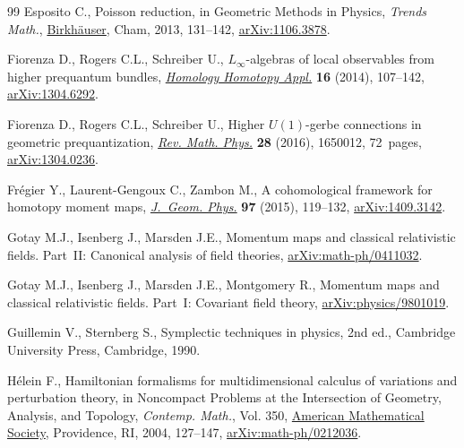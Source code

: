 \documentclass[pdftex]{sigma}
\numberwithin{equation}{section}
\begin{document}
\begin{thebibliography}{99}
Esposito C., Poisson reduction, in Geometric Methods in Physics, \textit{Trends Math.},
  \href{https://doi.org/10.1007/978-3-319-06248-8_11}{Birkh\"auser}, Cham, 2013, 131--142, \href{https://arxiv.org/abs/1106.3878}{arXiv:1106.3878}.

Fiorenza D., Rogers C.L., Schreiber U., {$L_\infty$}-algebras of local
  observables from higher prequantum bundles, \href{https://doi.org/10.4310/HHA.2014.v16.n2.a6}{\textit{Homology Homotopy Appl.}}
  \textbf{16} (2014), 107--142, \href{https://arxiv.org/abs/1304.6292}{arXiv:1304.6292}.

Fiorenza D., Rogers C.L., Schreiber U., Higher {$U(1)$}-gerbe connections in
  geometric prequantization, \href{https://doi.org/10.1142/S0129055X16500124}{\textit{Rev. Math. Phys.}} \textbf{28} (2016),
  1650012, 72~pages, \href{https://arxiv.org/abs/1304.0236}{arXiv:1304.0236}.

Fr\'egier Y., Laurent-Gengoux C., Zambon M., A cohomological framework for
  homotopy moment maps, \href{https://doi.org/10.1016/j.geomphys.2015.07.010}{\textit{J.~Geom. Phys.}} \textbf{97} (2015), 119--132,
  \href{https://arxiv.org/abs/1409.3142}{arXiv:1409.3142}.

Gotay M.J., Isenberg J., Marsden J.E., Momentum maps and classical relativistic
  fields. Part~{II}: {C}anonical analysis of field theories,
  \href{https://arxiv.org/abs/math-ph/0411032}{arXiv:math-ph/0411032}.

Gotay M.J., Isenberg J., Marsden J.E., Montgomery R., Momentum maps and
  classical relativistic fields. {P}art~{I}: {C}ovariant field theory,
  \href{https://arxiv.org/abs/physics/9801019}{arXiv:physics/9801019}.

Guillemin V., Sternberg S., Symplectic techniques in physics, 2nd ed.,
  Cambridge University Press, Cambridge, 1990.

H\'elein F., Hamiltonian formalisms for multidimensional calculus of variations
  and perturbation theory, in Noncompact Problems at the Intersection of
  Geometry, Analysis, and Topology, \textit{Contemp. Math.}, Vol. 350, \href{https://doi.org/10.1090/conm/350/06342}{American
  Mathematical Society}, Providence, RI, 2004, 127--147,
  \href{https://arxiv.org/abs/math-ph/0212036}{arXiv:math-ph/0212036}.


\end{thebibliography}
\end{document}
